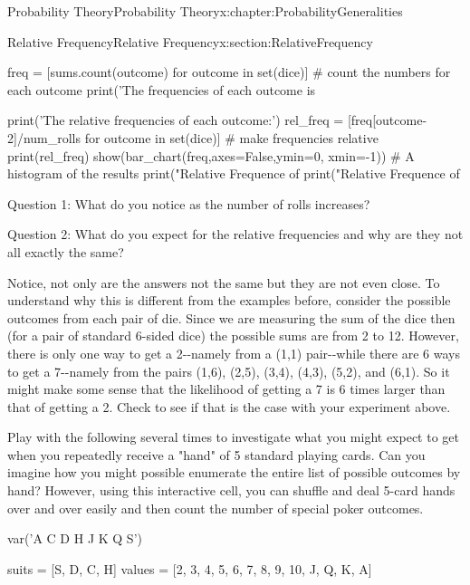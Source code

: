\documentclass[oneside,10pt,]{book}
\numberwithin{equation}{section}
\begin{document}
\begin{chapterptx}{Probability Theory}{}{Probability Theory}{}{}{x:chapter:ProbabilityGeneralities}
\begin{sectionptx}{Relative Frequency}{}{Relative Frequency}{}{}{x:section:RelativeFrequency}
\begin{sageinput}
    freq = [sums.count(outcome) for outcome in set(dice)]  # count the numbers for each outcome
    print('The frequencies of each outcome is %
    
    print('The relative frequencies of each outcome:')
    rel_freq = [freq[outcome-2]/num_rolls for outcome in set(dice)]  # make frequencies relative
    print(rel_freq)
    show(bar_chart(freq,axes=False,ymin=0, xmin=-1))     #  A histogram of the results
    print("Relative Frequence of %
    print("Relative Frequence of %
\end{sageinput}
Question 1: What do you notice as the number of rolls increases?%
\par
Question 2: What do you expect for the relative frequencies and why are they not all exactly the same?%
\par
Notice, not only are the answers not the same but they are not even close. To understand why this is different from the examples before, consider the possible outcomes from each pair of die. Since we are measuring the sum of the dice then (for a pair of standard 6-sided dice) the possible sums are from 2 to 12. However, there is only one way to get a 2-{}-{}namely from a (1,1) pair-{}-{}while there are 6 ways to get a 7-{}-{}namely from the pairs (1,6), (2,5), (3,4), (4,3), (5,2), and (6,1). So it might make some sense that the likelihood of getting a 7 is 6 times larger than that of getting a 2. Check to see if that is the case with your experiment above.%
\par
Play with the following several times to investigate what you might expect to get when you repeatedly receive a "hand" of 5 standard playing cards. Can you imagine how you might possible enumerate the entire list of possible outcomes by hand? However, using this interactive cell, you can shuffle and deal 5-card hands over and over easily and then count the number of special poker outcomes.%
\begin{sageinput}
var('A C D H J K Q S') 

suits = [S, D, C, H] 
values = [2, 3, 4, 5, 6, 7, 8, 9, 10, J, Q, K, A] 


\end{sageinput}
\end{sectionptx}
\end{chapterptx}
\end{document}
